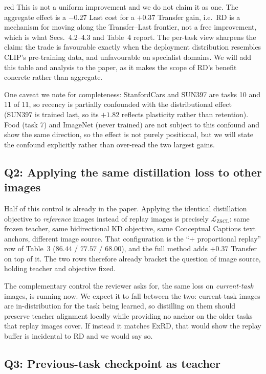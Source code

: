 \documentclass[11pt]{article}
\begin{document}
\begin{color}{red}
This is not a uniform improvement and we do not claim it as one. The aggregate effect is a $-0.27$ Last cost for a $+0.37$ Transfer gain, i.e.\ RD is a mechanism for moving along the Transfer--Last frontier, not a free improvement, which is what Secs.~4.2--4.3 and Table~4 report. The per-task view sharpens the claim: the trade is favourable exactly when the deployment distribution resembles CLIP's pre-training data, and unfavourable on specialist domains. We will add this table and analysis to the paper, as it makes the scope of RD's benefit concrete rather than aggregate.

One caveat we note for completeness: StanfordCars and SUN397 are tasks 10 and 11 of 11, so recency is partially confounded with the distributional effect (SUN397 is trained last, so its $+1.82$ reflects plasticity rather than retention). Food (task 7) and ImageNet (never trained) are not subject to this confound and show the same direction, so the effect is not purely positional, but we will state the confound explicitly rather than over-read the two largest gains.

\subsection*{Q2: Applying the same distillation loss to other images}

Half of this control is already in the paper. Applying the identical distillation objective to \emph{reference} images instead of replay images is precisely $\mathcal{L}_\text{ZSCL}$: same frozen teacher, same bidirectional KD objective, same Conceptual Captions text anchors, different image source. That configuration is the ``$+$ proportional replay'' row of Table~3 ($86.44$ / $77.57$ / $68.00$), and the full method adds $+0.37$ Transfer on top of it. The two rows therefore already bracket the question of image source, holding teacher and objective fixed.

The complementary control the reviewer asks for, the same loss on \emph{current-task} images, is running now. We expect it to fall between the two: current-task images are in-distribution for the task being learned, so distilling on them should preserve teacher alignment locally while providing no anchor on the older tasks that replay images cover. If instead it matches ExRD, that would show the replay buffer is incidental to RD and we would say so.

\subsection*{Q3: Previous-task checkpoint as teacher}


\end{color}
\end{document}
